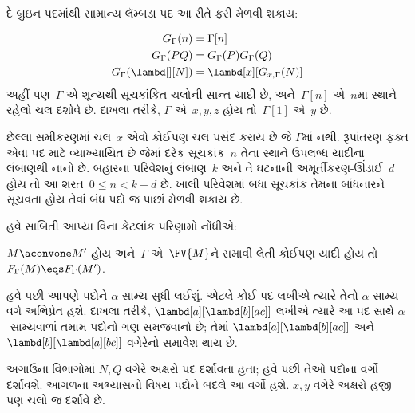 દે બ્રુઇન પદમાંથી સામાન્ય લૅમ્બડા પદ આ રીતે ફરી મેળવી શકાય:

\begin{defn}
  \begin{align*}
    G_\Gamma(n) &= \Gamma[n] \\
    G_\Gamma(PQ) &= G_\Gamma(P) G_\Gamma(Q) \\
    G_\Gamma(\lambd[][N]) &= \lambd[x][G_{x,\Gamma}(N)]
  \end{align*}
  અહીં પણ~$\Gamma$ એ શૂન્યથી સૂચકાંકિત ચલોની સાન્ત યાદી છે,
  અને~$\Gamma[n]$ એ~$n$મા સ્થાને રહેલો ચલ દર્શાવે છે.
  દાખલા તરીકે, $\Gamma$ એ~$x,y,z$ હોય તો~$\Gamma[1]$
  એ~$y$ છે.

  છેલ્લા સમીકરણમાં ચલ~$x$ એવો કોઈપણ ચલ પસંદ કરાય છે જે
  $\Gamma$માં નથી.
  રૂપાંતરણ ફક્ત એવા પદ માટે વ્યાખ્યાયિત છે જેમાં દરેક સૂચકાંક~$n$
  તેના સ્થાને ઉપલબ્ધ યાદીના લંબાણથી નાનો છે. બહારના પરિવેશનું
  લંબાણ~$k$ અને તે ઘટનાની અમૂર્તીકરણ-ઊંડાઈ~$d$ હોય તો આ
  શરત~$0\leq n<k+d$ છે. ખાલી પરિવેશમાં બધા સૂચકાંક તેમના
  બાંધનારને સૂચવતા હોય તેવાં બંધ પદો જ પાછાં મેળવી શકાય છે.
\end{defn}

હવે સાબિતી આપ્યા વિના કેટલાંક પરિણામો નોંધીએ:

\begin{prop}
  $M \aconvone M'$ હોય અને~$\Gamma$ એ~$\FV{M}$ને સમાવી
  લેતી કોઈપણ યાદી હોય તો
  $F_\Gamma(M) \eqs F_\Gamma(M')$.
\end{prop}
\endgroup


\begingroup
\makeatletter{}\makeatother

\label{guunit:OLP-0364}


હવે પછી આપણે પદોને $\alpha$-સામ્ય સુધી લઈશું. એટલે કોઈ પદ
લખીએ ત્યારે તેનો $\alpha$-સામ્ય વર્ગ અભિપ્રેત હશે. દાખલા તરીકે,
$\lambd[a][\lambd[b][a c]]$ લખીએ ત્યારે આ પદ સાથે
$\alpha$-સામ્યવાળાં તમામ પદોનો ગણ સમજવાનો છે; તેમાં
$\lambd[a][\lambd[b][a c]]$ અને
$\lambd[b][\lambd[a][b c]]$ વગેરેનો સમાવેશ થાય છે.

અગાઉના વિભાગોમાં $N, Q$ વગેરે અક્ષરો પદ દર્શાવતા હતા;
હવે પછી તેઓ પદોના વર્ગો દર્શાવશે. આગળના અભ્યાસનો વિષય
પદોને બદલે આ વર્ગો હશે. $x, y$ વગેરે અક્ષરો હજી પણ
ચલો જ દર્શાવે છે.

